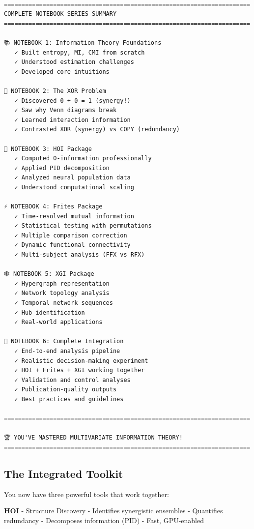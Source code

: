 \documentclass[
  11pt,
  letterpaper,
  oneside,
  openany]{book}
\begin{document}
\begin{verbatim}

======================================================================
COMPLETE NOTEBOOK SERIES SUMMARY
======================================================================

📚 NOTEBOOK 1: Information Theory Foundations
   ✓ Built entropy, MI, CMI from scratch
   ✓ Understood estimation challenges
   ✓ Developed core intuitions

🤯 NOTEBOOK 2: The XOR Problem
   ✓ Discovered 0 + 0 = 1 (synergy!)
   ✓ Saw why Venn diagrams break
   ✓ Learned interaction information
   ✓ Contrasted XOR (synergy) vs COPY (redundancy)

🔬 NOTEBOOK 3: HOI Package
   ✓ Computed O-information professionally
   ✓ Applied PID decomposition
   ✓ Analyzed neural population data
   ✓ Understood computational scaling

⚡ NOTEBOOK 4: Frites Package
   ✓ Time-resolved mutual information
   ✓ Statistical testing with permutations
   ✓ Multiple comparison correction
   ✓ Dynamic functional connectivity
   ✓ Multi-subject analysis (FFX vs RFX)

🕸️ NOTEBOOK 5: XGI Package
   ✓ Hypergraph representation
   ✓ Network topology analysis
   ✓ Temporal network sequences
   ✓ Hub identification
   ✓ Real-world applications

🎯 NOTEBOOK 6: Complete Integration
   ✓ End-to-end analysis pipeline
   ✓ Realistic decision-making experiment
   ✓ HOI + Frites + XGI working together
   ✓ Validation and control analyses
   ✓ Publication-quality outputs
   ✓ Best practices and guidelines

======================================================================

🏆 YOU'VE MASTERED MULTIVARIATE INFORMATION THEORY!
======================================================================
\end{verbatim}

\subsection{The Integrated Toolkit}\label{the-integrated-toolkit}

You now have three powerful tools that work together:

\textbf{HOI} - Structure Discovery - Identifies synergistic ensembles -
Quantifies redundancy - Decomposes information (PID) - Fast, GPU-enabled
\end{document}
